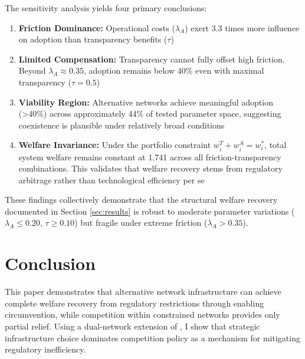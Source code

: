\documentclass[12pt]{article}
\begin{document}
The sensitivity analysis yields four primary conclusions:

\begin{enumerate}[noitemsep]
    \item \textbf{Friction Dominance:} Operational costs ($\lambda_A$) exert 3.3 times more influence on adoption than transparency benefits ($\tau$)
    
    \item \textbf{Limited Compensation:} Transparency cannot fully offset high friction. Beyond $\lambda_A \approx 0.35$, adoption remains below 40\% even with maximal transparency ($\tau = 0.5$)
    
    \item \textbf{Viability Region:} Alternative networks achieve meaningful adoption (>40\%) across approximately 44\% of tested parameter space, suggesting coexistence is plausible under relatively broad conditions
    
    \item \textbf{Welfare Invariance:} Under the portfolio constraint $w_i^T + w_i^A = w_i^*$, total system welfare remains constant at 1.741 across all friction-transparency combinations. This validates that welfare recovery stems from regulatory arbitrage rather than technological efficiency per se
\end{enumerate}

These findings collectively demonstrate that the structural welfare recovery documented in Section \ref{sec:results} is robust to moderate parameter variations ($\lambda_A \leq 0.20$, $\tau \geq 0.10$) but fragile under extreme friction ($\lambda_A > 0.35$).


\section{Conclusion}
\label{sec:conclusion}

This paper demonstrates that alternative network infrastructure can achieve complete welfare recovery from regulatory restrictions through enabling circumvention, while competition within constrained networks provides only partial relief. Using a dual-network extension of \citet{jalan_incentive-aware_2024}, I show that strategic infrastructure choice dominates competition policy as a mechanism for mitigating regulatory inefficiency.
\end{document}
